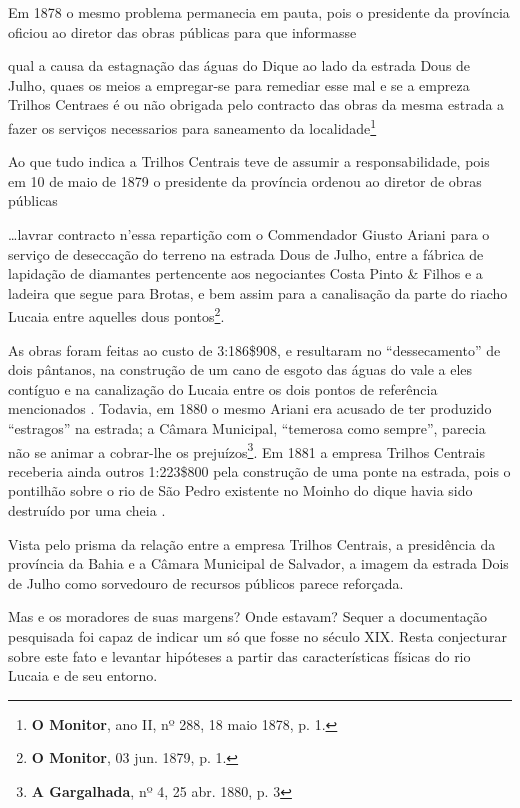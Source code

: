 Em 1878 o mesmo problema permanecia em pauta, pois o presidente da província oficiou ao diretor das obras públicas para que informasse 

\begin{citacao}
qual a causa da estagnação das águas do Dique ao lado da estrada Dous de Julho, quaes os meios a empregar-se para remediar esse mal e se a empreza Trilhos Centraes é ou não obrigada pelo contracto das obras da mesma estrada a fazer os serviços necessarios para saneamento da localidade\footnote{\textbf{O Monitor}, ano II, nº 288, 18 maio 1878, p. 1.}
\end{citacao}

Ao que tudo indica a Trilhos Centrais teve de assumir a responsabilidade, pois em 10 de maio de 1879 o presidente da província ordenou ao diretor de obras públicas 

\begin{citacao}
\dots lavrar contracto n'essa repartição com o Commendador Giusto Ariani para o serviço de deseccação do terreno na estrada Dous de Julho, entre a fábrica de lapidação de diamantes pertencente aos negociantes Costa Pinto \& Filhos e a ladeira que segue para Brotas, e bem assim para a canalisação da parte do riacho Lucaia entre aquelles dous pontos\footnote{\textbf{O Monitor}, 03 jun. 1879, p. 1.}.
\end{citacao}

As obras foram feitas ao custo de 3:186\$908, e resultaram no ``dessecamento'' de dois pântanos, na construção de um cano de esgoto das águas do vale a eles contíguo e na canalização do Lucaia entre os dois pontos de referência mencionados \cite[obras~publicas,~p.~9]{bahia_rpe_1880}. Todavia, em 1880 o mesmo Ariani era acusado de ter produzido ``estragos'' na estrada; a Câmara Municipal,  ``temerosa como sempre'', parecia não se animar a cobrar-lhe os prejuízos\footnote{\textbf{A Gargalhada}, nº 4, 25 abr. 1880, p. 3}. Em 1881 a empresa Trilhos Centrais receberia ainda outros 1:223\$800 pela construção de uma ponte na estrada, pois o pontilhão sobre o rio de São Pedro existente no Moinho do dique havia sido destruído por uma cheia \cite[obras~publicas,~pp.~8,~13]{bahia_rpe_1881}.

Vista pelo prisma da relação entre a empresa Trilhos Centrais, a presidência da província da Bahia e a Câmara Municipal de Salvador, a imagem da estrada Dois de Julho como sorvedouro de recursos públicos parece reforçada. 

Mas e os moradores de suas margens? Onde estavam? Sequer a documentação pesquisada foi capaz de indicar um só que fosse no século XIX. Resta conjecturar sobre este fato e levantar hipóteses a partir das características físicas do rio Lucaia e de seu entorno. 

